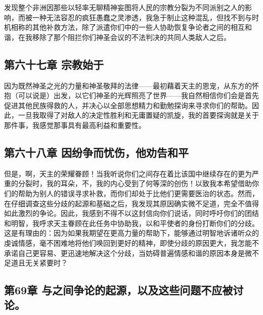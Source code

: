 发现整个非洲因那些以轻率无聊精神妄图将人民的宗教分裂为不同派别之人的影响，而被一种无法容忍的疯狂愚蠢之灵渗透，我急于制止这种混乱，但找不到与时机相称的其他补救方法，除了派遣你们中的一些人协助恢复争论者之间的相互和谐，在我移除了那个阻拦你们神圣会议的不法判决的共同人类敌人之后。\par


\subsection{第六十七章 宗教始于}

因为既然神圣之光的力量和神圣敬拜的法律——最初藉着天主的恩宠，从东方的怀抱（可以说是）出发，以它们神圣的光辉照亮了世界——我自然相信你们会是首先促进其他民族得救的人，并决心以全部思想精力和勤勉探询来寻求你们的帮助。因此，一旦我取得了对敌人的决定性胜利和无庸置疑的凯旋，我的首要探询就是关于那件事，我感觉那事具有最高利益和重要性。\par


\subsection{第六十八章 因纷争而忧伤，他劝告和平}

但是，啊，天主的荣耀眷顾！当我听说你们之间存在着比该国中继续存在的更为严重的分裂时，我的耳朵，不，我的内心受到了何等深的创伤！以致我本希望借助你们的帮助为别人的错误寻求补救，而你们却处于比他们更需要医治的状态。然而，在仔细调查这些分歧的起源和基础之后，我发现其原因确实微不足道，完全不值得如此激烈的争论。因此，我感到不得不以这封信向你们说话，同时呼吁你们的团结和明智，我呼求天主眷顾在此任务中协助我，以和平使者的身份打断你们的分歧。这是有理由的：因为如果我期望在更高力量的帮助下，能够通过明智地诉诸听众的虔诚情感，毫不困难地将他们唤回到更好的精神，即使分歧的原因更大，我怎能不承诺自己更容易、更迅速地解决这个分歧，当妨碍普遍情感和谐的原因本身是微不足道且无关紧要时？\par


\subsection{第69章 与之间争论的起源，以及这些问题不应被讨论。}

